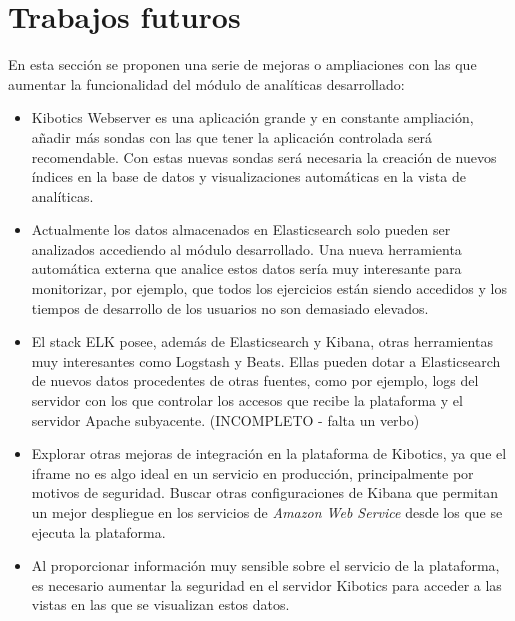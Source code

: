 \documentclass[a4paper, 12pt]{book}
\begin{document}
	\section{Trabajos futuros} 
	\label{sec:trabajos_futuros} 

		En esta sección se proponen una serie de mejoras o ampliaciones con las que aumentar la funcionalidad del módulo de analíticas desarrollado:

		\begin{itemize}
			\item Kibotics Webserver es una aplicación grande y en constante ampliación, añadir más sondas con las que tener la aplicación controlada será recomendable. Con estas nuevas sondas será necesaria la creación de nuevos índices en la base de datos y visualizaciones automáticas en la vista de analíticas.\\
			
			\item Actualmente los datos almacenados en Elasticsearch solo pueden ser analizados accediendo al módulo desarrollado. Una nueva herramienta automática externa que analice estos datos sería muy interesante para monitorizar, por ejemplo, que todos los ejercicios están siendo accedidos y los tiempos de desarrollo de los usuarios no son demasiado elevados.\\
			
			\item El stack ELK posee, además de Elasticsearch y Kibana, otras herramientas muy interesantes como Logstash y Beats. Ellas pueden dotar a Elasticsearch de nuevos datos procedentes de otras fuentes, como por ejemplo, logs del servidor con los que controlar los accesos que recibe la plataforma y el servidor Apache subyacente. (INCOMPLETO - falta un verbo)\\
			
			\item Explorar otras mejoras de integración en la plataforma de Kibotics, ya que el iframe no es algo ideal en un servicio en producción, principalmente por motivos de seguridad. Buscar otras configuraciones de Kibana que permitan un mejor despliegue en los servicios de \textit{Amazon Web Service} desde los que se ejecuta la plataforma.\\
						
			\item Al proporcionar información muy sensible sobre el servicio de la plataforma, es necesario aumentar la seguridad en el servidor Kibotics para acceder a las vistas en las que se visualizan estos datos.\\
		\end{itemize}
\end{document}
